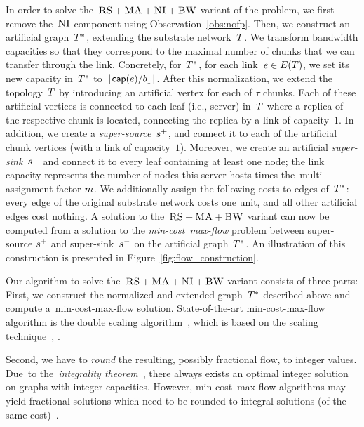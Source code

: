 In order to solve the~$\textsc{RS}+\textsc{MA}+\textsc{NI}+\textsc{BW}$ variant of the {\CTE} problem,
we first remove the~$\textsc{NI}$ component using Observation~\ref{obs:nofp}.
Then, we construct
an artificial graph~$T^*$, extending the substrate network~$T$.
We transform bandwidth capacities so that they correspond to the maximal number of chunks that we can transfer through the link.
Concretely, for~$T^*$, for each link~$e\in E(T)$, we set its new
capacity in~$T^*$ to~$\lfloor\textsf{cap}(e) / b_1\rfloor$.
After this normalization, we extend the topology~$T$ by
introducing an artificial vertex for each of $\tau$ chunks. Each of these artificial
vertices is connected to each leaf (i.e., server) in~$T$ where a replica
 of the respective chunk is located,
connecting the replica by a link of capacity~$1$. In
addition, we create a
\emph{super-source}~$s^{+}$, and connect it to each of the artificial chunk
vertices (with a link of capacity~$1$). Moreover, we create an artificial \emph{super-sink}~$s^{-}$ and
connect it to every leaf containing at least one node; the link capacity represents
the number of nodes this server hosts times the~multi-assignment factor
$m$.
We additionally assign the following costs to edges of~$T^*$:
every edge of the original substrate network costs one unit, and all other artificial edges
cost nothing.
A solution to the~$\textsc{RS}+\textsc{MA}+\textsc{BW}$ variant can now be computed
from a solution to the \emph{min-cost~max-flow} problem between super-source
$s^{+}$ and
super-sink~$s^{-}$ on the artificial graph~$T^*$.
An illustration of this construction is presented in Figure~\ref{fig:flow_construction}.

Our algorithm to solve the~$\textsc{RS}+\textsc{MA}+\textsc{NI}+\textsc{BW}$ variant consists of three parts:
First, we construct the normalized and extended graph~$T^*$
described above and compute
a~min-cost-max-flow solution.
State-of-the-art min-cost-max-flow algorithm is the double scaling algorithm~\cite{mincostmaxflow-state}, which is based on the scaling technique~\cite{mincostmaxflow-1,mincostmaxflow-2}, .

Second, we have to \emph{round} the resulting, possibly fractional flow, to
integer values. Due~to the~\emph{integrality theorem}~\cite{flow-book},
there always exists an optimal integer solution on graphs with integer capacities.
However, min-cost~max-flow algorithms may yield fractional solutions
which need to be rounded to integral solutions (of the same cost)~\cite{electric-flows}.


